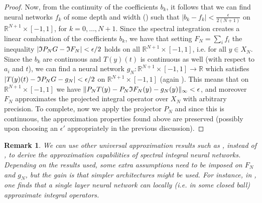 \documentclass[11pt,fleqn]{amsart} %
\newtheorem{remark}[theorem]{Remark}
\begin{document}
\begin{proof}
		Now, from the continuity of the coefficients $b_k$, it follows that we can find neural networks $f_k$ of some depth and width (\cite{Lu}) such that $|b_k - f_k| < \frac{\epsilon}{2(N+1)}$ on $\mathbb R^{N+1} \times [-1,1]$, for $k = 0, \ldots, N+1$. Since the spectral integration creates a linear combination of the coefficients $b_k$, we have that setting $F_N = \sum_i f_i$ the inequality $|\frak I P_N G - \frak I F_N| < \epsilon/2$ holds on all $\mathbb R^{N+1} \times [-1,1]$, i.e. for all $y\in X_N$. Since the $b_k$ are continuous and $T(y)(t)$ is continuous as well (with respect to $a_i$ and $t$), we can find a neural network $g_N: \mathbb R^{N+1} \times [-1,1] \longrightarrow \mathbb R$ which satisfies $|T(y)(t) - \frak I P_N G - g_N|<\epsilon/2$ on $\mathbb R^{N+1} \times [-1,1]$ (again \cite{Lu}). This means that on $\mathbb R^{N+1} \times [-1,1]$ we have $\|P_NT(y) - P_N \frak I F_N(y) - g_N(y)\|_\infty < \epsilon$, and moreover $F_N$ approximates the projected integral operator over $X_N$ with arbitrary precision. To complete, now we apply the projector $P_N$ and since this is continuous, the approximation properties found above are preserved (possibly upon choosing an $\epsilon'$ appropriately in the previous discussion).
	\end{proof}
	
	\begin{remark}
		{\rm 
			We can use other universal approximation results such as \cite{Horn}, instead of \cite{Lu}, to derive the approximation capabilities of spectral integral neural networks. Depending on the results used, some extra assumptions need to be imposed on $F_N$ and $g_N$, but the gain is that simpler architectures might be used. For instance, in \cite{Horn}, one finds that a single layer neural network can locally (i.e. in some closed ball) approximate integral operators. 
		}
	\end{remark}
	
\end{document}
